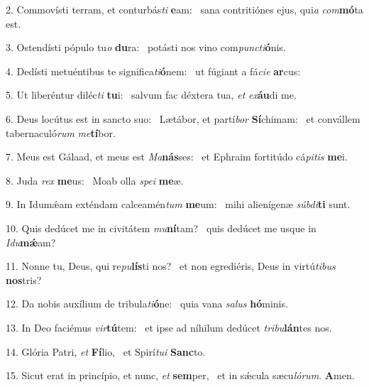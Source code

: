 2. Commovísti terram, et conturbás\textit{ti} \textbf{e}am: \ast\  sana contritiónes ejus, qui\textit{a} \textit{com}\textbf{mó}ta est.\

3. Ostendísti pópulo tu\textit{o} \textbf{du}ra: \ast\  potásti nos vino com\textit{punc}\textit{ti}\textbf{ó}nis.\

4. Dedísti metuéntibus te significa\textit{ti}\textbf{ó}nem: \ast\  ut fúgiant a fá\textit{ci}\textit{e} \textbf{ar}cus:\

5. Ut liberéntur diléc\textit{ti} \textbf{tu}i: \ast\  salvum fac déxtera tua, \textit{et} \textit{ex}\textbf{áu}di me.\

6. Deus locútus est in sancto suo: \dag\  Lætábor, et partí\textit{bor} \textbf{Sí}chimam: \ast\  et convállem tabernaculó\textit{rum} \textit{me}\textbf{tí}bor.\

7. Meus est Gálaad, et meus est \textit{Ma}\textbf{nás}ses: \ast\  et Ephraim fortitúdo cá\textit{pi}\textit{tis} \textbf{me}i.\

8. Juda \textit{rex} \textbf{me}us: \ast\  Moab olla \textit{spe}\textit{i} \textbf{me}æ.\

9. In Idumǽam exténdam calceamén\textit{tum} \textbf{me}um: \ast\  mihi alienígenæ \textit{súb}\textit{di}\textbf{ti} sunt.\

10. Quis dedúcet me in civitátem \textit{mu}\textbf{ní}tam? \ast\  quis dedúcet me usque in \textit{I}\textit{du}\textbf{mǽ}am?\

11. Nonne tu, Deus, qui re\textit{pu}\textbf{lís}ti nos? \ast\  et non egrediéris, Deus in virtú\textit{ti}\textit{bus} \textbf{nos}tris?\

12. Da nobis auxílium de tribula\textit{ti}\textbf{ó}ne: \ast\  quia vana \textit{sa}\textit{lus} \textbf{hó}minis.\

13. In Deo faciémus \textit{vir}\textbf{tú}tem: \ast\  et ipse ad níhilum dedúcet \textit{tri}\textit{bu}\textbf{lán}tes nos.\

14. Glória Patri, \textit{et} \textbf{Fí}lio, \ast\  et Spirí\textit{tu}\textit{i} \textbf{Sanc}to.\

15. Sicut erat in princípio, et nunc, \textit{et} \textbf{sem}per, \ast\  et in sǽcula sæcu\textit{ló}\textit{rum}. \textbf{A}men.\

